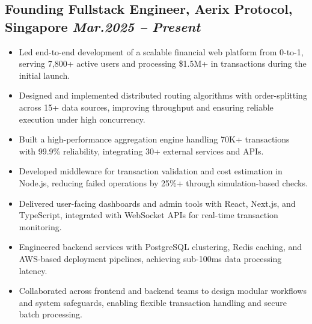 \documentclass[11pt,a4paper]{article}
\newcommand{\resumeItem}[1]{\item\small{#1}}
\begin{document}
\subsection{Founding Fullstack Engineer, Aerix Protocol, Singapore \hfill \textit{Mar.2025 -- Present}}
\begin{itemize}[leftmargin=*, itemsep=1pt, parsep=0pt]
    \resumeItem{Led end-to-end development of a scalable financial web platform from 0-to-1, serving 7,800+ active users and processing \$1.5M+ in transactions during the initial launch.}
    \resumeItem{Designed and implemented distributed routing algorithms with order-splitting across 15+ data sources, improving throughput and ensuring reliable execution under high concurrency.}
    \resumeItem{Built a high-performance aggregation engine handling 70K+ transactions with 99.9\% reliability, integrating 30+ external services and APIs.}
    \resumeItem{Developed middleware for transaction validation and cost estimation in Node.js, reducing failed operations by 25\%+ through simulation-based checks.}
    \resumeItem{Delivered user-facing dashboards and admin tools with React, Next.js, and TypeScript, integrated with WebSocket APIs for real-time transaction monitoring.}
    \resumeItem{Engineered backend services with PostgreSQL clustering, Redis caching, and AWS-based deployment pipelines, achieving sub-100ms data processing latency.}
    \resumeItem{Collaborated across frontend and backend teams to design modular workflows and system safeguards, enabling flexible transaction handling and secure batch processing.}
\end{itemize}
\end{document}
